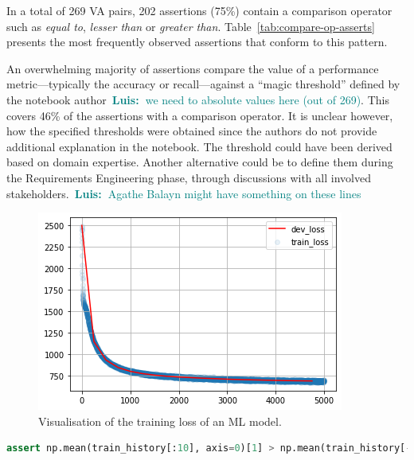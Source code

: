 \documentclass[conference]{IEEEtran}
\newcommand{\luis}[1]{\textcolor{teal}{\ding{46}~\textbf{Luis:~}#1}}
\begin{document}
In a total of 269 VA pairs, 202 assertions (75\%) contain a comparison operator such as \emph{equal to}, \emph{lesser than} or \emph{greater than}. Table~\ref{tab:compare-op-asserts} presents the most frequently observed assertions that conform to this pattern.

An overwhelming majority of assertions compare the value of a performance metric---typically the accuracy or recall---against a ``magic threshold'' defined by the notebook author\luis{we need to absolute values here (out of 269)}. This covers 46\% of the assertions with a comparison operator. It is unclear however, how the specified thresholds were obtained since the authors do not provide additional explanation in the notebook. The threshold could have been derived based on domain expertise. Another alternative could be to define them during the Requirements Engineering phase, through discussions with all involved stakeholders\cite{CITEME}.\luis{Agathe Balayn might have something on these lines}

\begin{figure}
  \includegraphics[width=\linewidth]{../catalogue/select-16.png}
  \caption{Visualisation of the training loss of an ML model.}\label{fig:loss}
\end{figure}

\begin{lstlisting}[language=Python, caption={Assertion to check that the mean of the first 10 observations of the loss is higher than the mean of the last 10 observations. In other words, the assertion checks if the loss function is converging to an optimal minima.}, label={lst:loss}]
assert np.mean(train_history[:10], axis=0)[1] > np.mean(train_history[-10:], axis=0)[1], "The model didn't converge."
\end{lstlisting}
\end{document}
